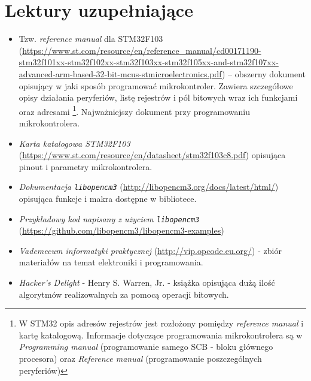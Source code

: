 \section{Lektury uzupełniające}
\begin{itemize}

\item Tzw. \emph{reference manual} dla STM32F103 \label{refman}
	(\url{https://www.st.com/resource/en/reference_manual/cd00171190-stm32f101xx-stm32f102xx-stm32f103xx-stm32f105xx-and-stm32f107xx-advanced-arm-based-32-bit-mcus-stmicroelectronics.pdf})
	– obszerny dokument opisujący w jaki sposób programować  mikrokontroler.
	Zawiera szczegółowe opisy działania peryferiów, listę rejestrów i pól bitowych wraz ich funkcjami oraz  adresami
	\footnote{%
		W STM32 opis adresów rejestrów jest rozłożony pomiędzy \textit{reference manual} i kartę katalogową. Informacje dotyczące
		programowania mikrokontrolera są w \textit{Programming manual} (programowanie samego SCB - bloku głównego procesora) oraz
		\textit{Reference manual} (programowanie poszczególnych peryferiów)
	}.
	Najważniejszy dokument przy programowaniu mikrokontrolera.
\item \emph{Karta katalogowa STM32F103} (\url{https://www.st.com/resource/en/datasheet/stm32f103c8.pdf}) opisująca pinout i parametry mikrokontrolera.
\item \emph{Dokumentacja \Verb$libopencm3$} (\url{http://libopencm3.org/docs/latest/html/}) opisująca funkcje i makra dostępne w bibliotece.
\item \emph{Przykładowy kod napisany z użyciem \Verb$libopencm3$}\\ (\url{https://github.com/libopencm3/libopencm3-examples}) 
\item \emph{Vademecum informatyki praktycznej} (\url{http://vip.opcode.eu.org/}) - zbiór materiałów na temat elektroniki i programowania.
\item \emph{Hacker's Delight} - Henry S. Warren, Jr. - książka opisująca dużą ilość algorytmów realizowalnych za pomocą operacji bitowych.
\end{itemize}
